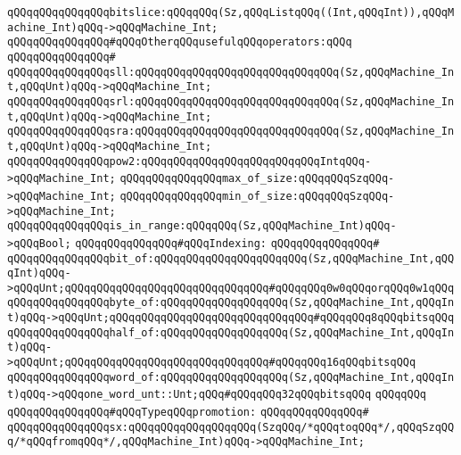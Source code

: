 \verb|qQQqqQQqqQQqqQQqbitslice:qQQqqQQq(Sz,qQQqListqQQq((Int,qQQqInt)),qQQqMachine_Int)qQQq->qQQqMachine_Int;|\newline
\newline
\verb|qQQqqQQqqQQqqQQq#qQQqOtherqQQqusefulqQQqoperators:qQQq|\newline
\verb|qQQqqQQqqQQqqQQq#|\newline
\verb|qQQqqQQqqQQqqQQqsll:qQQqqQQqqQQqqQQqqQQqqQQqqQQqqQQq(Sz,qQQqMachine_Int,qQQqUnt)qQQq->qQQqMachine_Int;|\newline
\verb|qQQqqQQqqQQqqQQqsrl:qQQqqQQqqQQqqQQqqQQqqQQqqQQqqQQq(Sz,qQQqMachine_Int,qQQqUnt)qQQq->qQQqMachine_Int;|\newline
\verb|qQQqqQQqqQQqqQQqsra:qQQqqQQqqQQqqQQqqQQqqQQqqQQqqQQq(Sz,qQQqMachine_Int,qQQqUnt)qQQq->qQQqMachine_Int;|\newline
\verb|qQQqqQQqqQQqqQQqpow2:qQQqqQQqqQQqqQQqqQQqqQQqqQQqIntqQQq->qQQqMachine_Int;|\newline
\verb|qQQqqQQqqQQqqQQqmax_of_size:qQQqqQQqSzqQQq->qQQqMachine_Int;|\newline
\verb|qQQqqQQqqQQqqQQqmin_of_size:qQQqqQQqSzqQQq->qQQqMachine_Int;|\newline
\verb|qQQqqQQqqQQqqQQqis_in_range:qQQqqQQq(Sz,qQQqMachine_Int)qQQq->qQQqBool;|\newline
\newline
\verb|qQQqqQQqqQQqqQQq#qQQqIndexing:|\newline
\verb|qQQqqQQqqQQqqQQq#|\newline
\verb|qQQqqQQqqQQqqQQqbit_of:qQQqqQQqqQQqqQQqqQQqqQQq(Sz,qQQqMachine_Int,qQQqInt)qQQq->qQQqUnt;qQQqqQQqqQQqqQQqqQQqqQQqqQQqqQQq#qQQqqQQq0w0qQQqorqQQq0w1qQQq|\newline
\verb|qQQqqQQqqQQqqQQqbyte_of:qQQqqQQqqQQqqQQqqQQq(Sz,qQQqMachine_Int,qQQqInt)qQQq->qQQqUnt;qQQqqQQqqQQqqQQqqQQqqQQqqQQqqQQq#qQQqqQQq8qQQqbitsqQQq|\newline
\verb|qQQqqQQqqQQqqQQqhalf_of:qQQqqQQqqQQqqQQqqQQq(Sz,qQQqMachine_Int,qQQqInt)qQQq->qQQqUnt;qQQqqQQqqQQqqQQqqQQqqQQqqQQqqQQq#qQQqqQQq16qQQqbitsqQQq|\newline
\verb|qQQqqQQqqQQqqQQqword_of:qQQqqQQqqQQqqQQqqQQq(Sz,qQQqMachine_Int,qQQqInt)qQQq->qQQqone_word_unt::Unt;qQQq#qQQqqQQq32qQQqbitsqQQq|\newline
\verb|qQQqqQQq|\newline
\verb|qQQqqQQqqQQqqQQq#qQQqTypeqQQqpromotion:|\newline
\verb|qQQqqQQqqQQqqQQq#|\newline
\verb|qQQqqQQqqQQqqQQqsx:qQQqqQQqqQQqqQQqqQQq(SzqQQq/*qQQqtoqQQq*/,qQQqSzqQQq/*qQQqfromqQQq*/,qQQqMachine_Int)qQQq->qQQqMachine_Int;|\newline
